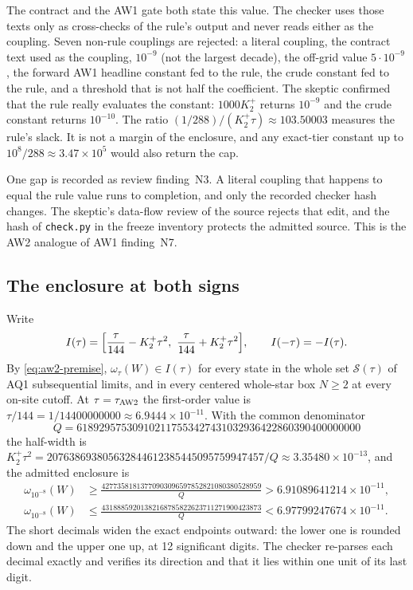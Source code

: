 The contract and the AW1 gate both state this value. The checker uses those
texts only as cross-checks of the rule's output and never reads either as the
coupling. Seven non-rule couplings
are rejected: a literal coupling, the contract text used as the coupling,
$10^{-9}$ (not the largest decade), the off-grid value $5\cdot10^{-9}$, the
forward AW1 headline constant fed to the rule, the crude constant fed to the
rule, and a threshold that is not half the coefficient. The skeptic confirmed
that the rule really evaluates the constant: $1000K_2^+$ returns $10^{-9}$ and
the crude constant returns $10^{-10}$. The ratio
$(1/288)/(K_2^+\tau)\approx103.50003$ measures the rule's slack. It is not a
margin of the enclosure, and any exact-tier constant up to
$10^8/288\approx3.47\times10^5$ would also return the cap.

One gap is recorded as review finding~N3. A literal coupling that happens to
equal the rule value runs to completion, and only the recorded checker hash
changes. The skeptic's data-flow review of the source rejects that edit, and
the hash of \texttt{check.py} in the freeze inventory protects the admitted
source. This is the AW2 analogue of AW1 finding~N7.

\subsection{The enclosure at both signs}
\label{sec:aw2-enclosure}
Write
\begin{equation}
 I(\tau)=\Bigl[\frac{\tau}{144}-K_2^+\tau^2,\ \frac{\tau}{144}+K_2^+\tau^2\Bigr],
 \qquad I(-\tau)=-I(\tau).
 \label{eq:aw2-interval}
\end{equation}
By \eqref{eq:aw2-premise}, $\omega_\tau(W)\in I(\tau)$ for every state in the
whole set $\mathcal S(\tau)$ of AQ1 subsequential limits, and in every
centered whole-star box $N\ge2$ at every on-site cutoff. At
$\tau=\tau_{\rm AW2}$ the first-order value is
$\tau/144=1/14400000000\approx6.9444\times10^{-11}$. With the common
denominator
\begin{equation}
 Q=618929575309102117553427431032936422860390400000000
 \label{eq:aw2-Q}
\end{equation}
the half-width is
$K_2^+\tau^2=207638693805632844612385445095759947457/Q\approx3.35480\times10^{-13}$,
and the admitted enclosure is
\begin{equation}
 \boxed{\;
 \begin{aligned}
 \omega_{10^{-8}}(W)&\ge\frac{42773581813770903096597852821080380528959}{Q}>6.91089641214\times10^{-11},\\
 \omega_{10^{-8}}(W)&\le\frac{43188859201382168785822623711271900423873}{Q}<6.97799247674\times10^{-11}.
 \end{aligned}\;}
 \label{eq:aw2-enclosure}
\end{equation}
The short decimals widen the exact endpoints outward: the lower one is rounded
down and the upper one up, at 12 significant digits. The checker re-parses
each decimal exactly and verifies its direction and that it lies within one
unit of its last digit.

